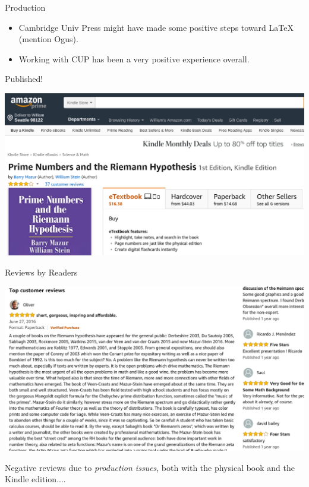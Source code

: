 \documentclass{beamer}
\begin{document}
\begin{frame}{Production}

  \begin{itemize}
    \item Cambridge Univ Press might have made some positive steps toward \LaTeX{} (mention Ogus).
    \item Working with CUP has been a very positive experience overall.
  \end{itemize}

\end{frame}

\begin{frame}{Published!}

  \includegraphics[width=.98\textwidth]{pics/amazon-prime.png}

\end{frame}



\begin{frame}{Reviews by Readers}

  \includegraphics[width=.98\textwidth]{pics/amazon-review.png}

  \vfill

  Negative reviews  due to \textit{production issues}, both with the physical book
  and the Kindle edition....

\end{frame}
\end{document}
